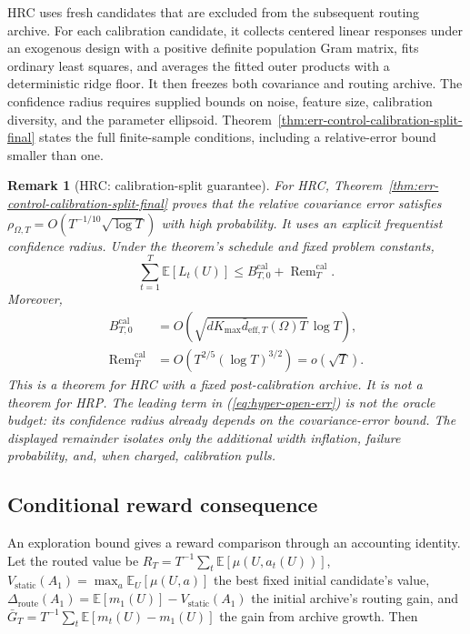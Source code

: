 \documentclass{article} %
\newtheorem{remark}{Remark}
\providecommand{\E}{\mathbb{E}}
\renewcommand{\eqref}[1]{\textup{(\ref{#1})}}
\begin{document}
HRC uses fresh candidates that are excluded from the subsequent routing
archive. For each calibration candidate, it collects centered linear
responses under an exogenous design with a positive definite population
Gram matrix, fits ordinary least squares, and averages the fitted outer
products with a deterministic ridge floor. It then freezes both covariance
and routing archive. The confidence radius requires supplied bounds on
noise, feature size, calibration diversity, and the parameter ellipsoid.
Theorem~\ref{thm:err-control-calibration-split-final} states the full
finite-sample conditions, including a relative-error bound smaller than one.

\begin{remark}[HRC: calibration-split guarantee]
For HRC, Theorem~\ref{thm:err-control-calibration-split-final} proves that the relative covariance error satisfies $\rho_{\Omega,T}=O(T^{-1/10}\sqrt{\log T})$ with high probability. It uses an explicit frequentist confidence radius. Under the theorem's schedule and fixed problem constants,
\begin{equation}
\label{eq:hyper-open-err}
\sum_{t=1}^{T}\mathbb{E}[L_t(U)]
\le
B_{T,0}^{\mathrm{cal}}
+
\operatorname{Rem}_T^{\mathrm{cal}}.
\end{equation}
Moreover,
\begin{equation}
\label{eq:hyper-open-rates}
\begin{aligned}
B_{T,0}^{\mathrm{cal}}
&=
O\!\left(
\sqrt{dK_{\max}\bar d_{\mathrm{eff},T}(\Omega)T}\,\log T
\right),\\
\operatorname{Rem}_T^{\mathrm{cal}}
&=
O\!\left(T^{2/5}(\log T)^{3/2}\right)
=o(\sqrt T).
\end{aligned}
\end{equation}
This is a theorem for HRC with a fixed post-calibration archive. It is not a theorem for HRP.
The leading term in \eqref{eq:hyper-open-err} is not the oracle budget: its
confidence radius already depends on the covariance-error bound. The displayed
remainder isolates only the additional width inflation, failure probability,
and, when charged, calibration pulls.
\end{remark}

\subsection{Conditional reward consequence}

An exploration bound gives a reward comparison through an accounting
identity. Let the routed value be
$R_T=T^{-1}\sum_t\E[\mu(U,a_t(U))]$,
$V_{\mathrm{static}}(A_1)=\max_a\E_U[\mu(U,a)]$ the best fixed initial
candidate's value, $\Delta_{\mathrm{route}}(A_1)=\E[m_1(U)]-
V_{\mathrm{static}}(A_1)$ the initial archive's routing gain, and
$\bar G_T=T^{-1}\sum_t\E[m_t(U)-m_1(U)]$ the gain from archive growth.
Then
\end{document}

